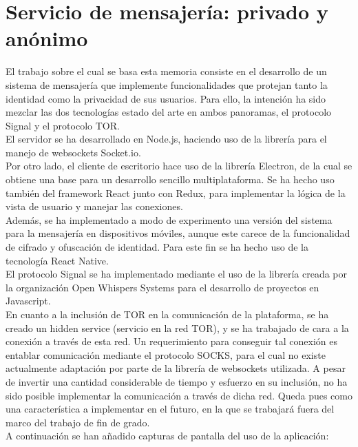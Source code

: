 \chapter{Servicio de mensajería: privado y anónimo}

El trabajo sobre el cual se basa esta memoria consiste en el desarrollo de un sistema de mensajería que implemente funcionalidades que protejan tanto la identidad como la privacidad de sus usuarios. Para ello, la intención ha sido mezclar las dos tecnologías estado del arte en ambos panoramas, el protocolo Signal y el protocolo TOR. \\

El servidor se ha desarrollado en Node.js, haciendo uso de la librería para el manejo de websockets Socket.io. \\

Por otro lado, el cliente de escritorio hace uso de la librería Electron, de la cual se obtiene una base para un desarrollo sencillo multiplataforma. Se ha hecho uso también del framework React junto con Redux, para implementar la lógica de la vista de usuario y manejar las conexiones. \\

Además, se ha implementado a modo de experimento una versión del sistema para la mensajería en dispositivos móviles, aunque este carece de la funcionalidad de cifrado y ofuscación de identidad. Para este fin se ha hecho uso de la tecnología React Native. \\

El protocolo Signal se ha implementado mediante el uso de la librería creada por la organización Open Whispers Systems para el desarrollo de proyectos en Javascript. \\

En cuanto a la inclusión de TOR en la comunicación de la plataforma, se ha creado un hidden service (servicio en la red TOR), y se ha trabajado de cara a la conexión a través de esta red. Un requerimiento para conseguir tal conexión es entablar comunicación mediante el protocolo SOCKS, para el cual no existe actualmente adaptación por parte de la librería de websockets utilizada. A pesar de invertir una cantidad considerable de tiempo y esfuerzo en su inclusión, no ha sido posible implementar la comunicación a través de dicha red. Queda pues como una característica a implementar en el futuro, en la que se trabajará fuera del marco del trabajo de fin de grado. \\ 

A continuación se han añadido capturas de pantalla del uso de la aplicación: \\

